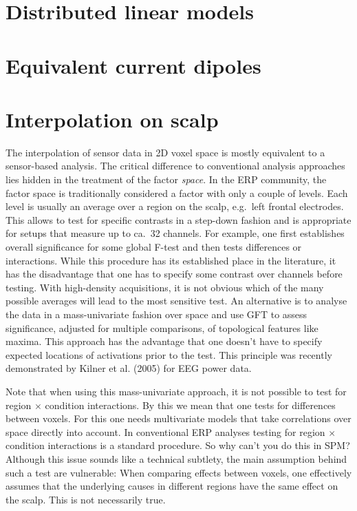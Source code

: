 \section{Distributed linear models}

\section{Equivalent current dipoles}

\section{Interpolation on scalp}
The interpolation of sensor data in 2D voxel space is mostly equivalent to
a sensor-based analysis. The critical difference to conventional
analysis approaches lies hidden in the treatment of the factor {\it
space}. In the ERP community, the factor space is traditionally 
considered a factor with only a couple of levels. Each level is
usually an average over a region on the scalp, e.g.~left frontal
electrodes. This allows to test for specific contrasts in a step-down
fashion and is appropriate for setups that measure up to ca.~32
channels. For example, one first establishes overall significance for 
some global F-test and then tests differences or interactions. While
this procedure has its established place in the literature, it has the
disadvantage that one has to specify some contrast over
channels before testing. With high-density acquisitions, it is not
obvious which of the many possible averages will lead to the most
sensitive test. An alternative is to analyse the data in a
mass-univariate fashion over space and use GFT to assess
significance, adjusted for multiple comparisons, of topological
features like maxima. This approach has the advantage that one doesn't
have to specify expected locations of activations prior to the
test. This principle was recently demonstrated by Kilner et al. (2005)
for EEG power data.

Note that when using this mass-univariate approach, it is not possible
to test for region $\times$ condition interactions. By this we mean
that one tests for differences between voxels. For this one needs
multivariate models that take correlations over space directly into
account. In conventional ERP analyses testing for region $\times$
condition interactions is a standard procedure. So why can't you do
this in SPM? Although this issue sounds like a technical subtlety, the
main assumption behind such a test are vulnerable: When comparing
effects between voxels, one effectively assumes that the underlying
causes in different regions have the same effect on the scalp. This is
not necessarily true. 
